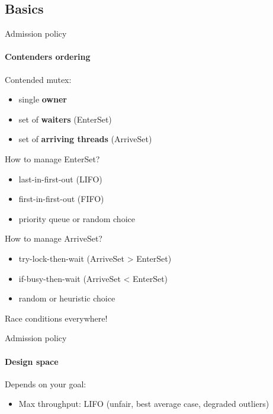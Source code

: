 \subsection{Basics}

\showTOCSub

\begin{frame}{Admission policy}
\framesubtitle{Contenders ordering}

Contended mutex: 
\begin{itemize}
    \item single \textbf{owner}
    \item set of \textbf{waiters} (EnterSet)
    \item set of \textbf{arriving threads} (ArriveSet)
\end{itemize}

\pause

How to manage EnterSet?

\pause

\begin{itemize}
    \item last-in-first-out (LIFO)
    \item first-in-first-out (FIFO)
    \item priority queue or random choice    
\end{itemize}

\pause

How to manage ArriveSet?

\pause

\begin{itemize}
    \item try-lock-then-wait (ArriveSet > EnterSet)
    \item if-busy-then-wait (ArriveSet < EnterSet)
    \item random or heuristic choice    
\end{itemize}

\pause

Race conditions everywhere!
\end{frame}

\begin{frame}[t]{Admission policy}
\framesubtitle{Design space}

Depends on your goal:
\begin{itemize}
    \item Max throughput: LIFO (unfair, best average case, degraded outliers)
\end{itemize}    

\end{frame}

